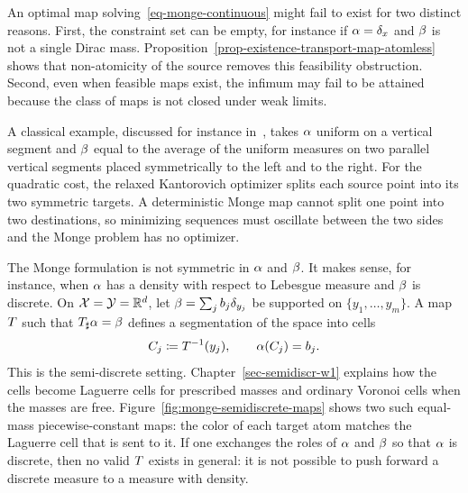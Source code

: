 \begin{rem}
	An optimal map solving~\eqref{eq-monge-continuous} might fail to exist for two distinct reasons. First, the constraint set can be empty, for instance if $\alpha=\delta_x$ and $\beta$ is not a single Dirac mass. Proposition~\ref{prop-existence-transport-map-atomless} shows that non-atomicity of the source removes this feasibility obstruction. Second, even when feasible maps exist, the infimum may fail to be attained because the class of maps is not closed under weak limits.
\end{rem}

\begin{example}\label{ex-splitting-obstruction}
	A classical example, discussed for instance in~\cite{SantambrogioBook}, takes $\alpha$ uniform on a vertical segment and $\beta$ equal to the average of the uniform measures on two parallel vertical segments placed symmetrically to the left and to the right. For the quadratic cost, the relaxed Kantorovich optimizer splits each source point into its two symmetric targets. A deterministic Monge map cannot split one point into two destinations, so minimizing sequences must oscillate between the two sides and the Monge problem has no optimizer.
\end{example}

\begin{example}
	The Monge formulation is not symmetric in $\alpha$ and $\beta$. It makes sense, for instance, when $\alpha$ has a density with respect to Lebesgue measure and $\beta$ is discrete. On $\mathcal{X}=\mathcal{Y}=\mathbb{R}^d$, let $\beta=\sum_j b_j\delta_{y_j}$ be supported on $\{y_1,\ldots,y_m\}$. A map $T$ such that $T_\sharp\alpha=\beta$ defines a segmentation of the space into cells
	\[
		C_j\coloneqq T^{-1}(y_j),
		\qquad
		\alpha(C_j)=b_j.
	\]
	This is the semi-discrete setting. Chapter~\ref{sec-semidiscr-w1} explains how the cells become Laguerre cells for prescribed masses and ordinary Voronoi cells when the masses are free. Figure~\ref{fig:monge-semidiscrete-maps} shows two such equal-mass piecewise-constant maps: the color of each target atom matches the Laguerre cell that is sent to it. If one exchanges the roles of $\alpha$ and $\beta$ so that $\alpha$ is discrete, then no valid $T$ exists in general: it is not possible to push forward a discrete measure to a measure with density.
\end{example}

